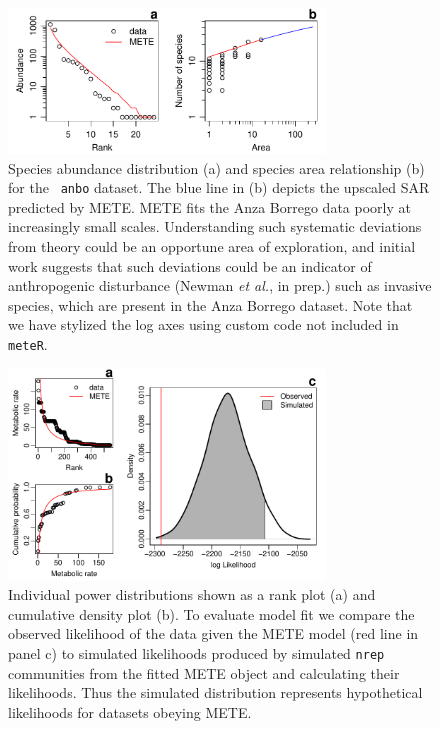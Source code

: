 \begin{figure}[!h] 
  \begin{center}
    \includegraphics[width=0.75\textwidth]{figs/meteR_MS_v3-anbo_plot}
    \caption[Species abundance distribution and species area
    relationship for the \texttt{anbo} dataset]{Species abundance
      distribution (a) and species area relationship (b) for the
      \texttt{ anbo} dataset. The blue line in (b) depicts the
      upscaled SAR predicted by METE. METE fits the Anza Borrego data
      poorly at increasingly small scales. Understanding such
      systematic deviations from theory could be an opportune area of
      exploration, and initial work suggests that such deviations
      could be an indicator of anthropogenic disturbance (Newman
      \textit{et al.}, in prep.) such as invasive species, which are
      present in the Anza Borrego dataset. Note that we have stylized
      the log axes using custom code not included in \texttt{meteR}.}
\label{fig:anbo}
\end{center} 
\end{figure}


\begin{figure}[!h] 
  \begin{center}
    \includegraphics[width=0.75\textwidth]{figs/meteR_MS_v3-arth_plot}
    \caption[Individual power distributions shown]{Individual power
      distributions shown as a rank plot (a) and cumulative density
      plot (b). To evaluate model fit we compare the observed
      likelihood of the data given the METE model (red line in panel
      c) to simulated likelihoods produced by simulated \texttt{nrep}
      communities from the fitted METE object and calculating their
      likelihoods. Thus the simulated distribution represents
      hypothetical likelihoods for datasets obeying METE.}
\label{fig:arth} 
\end{center} 
\end{figure}

